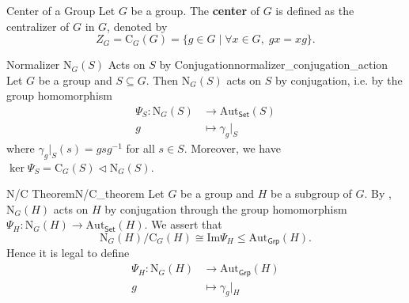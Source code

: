 \begin{definition}{Center of a Group}{}
    Let $G$ be a group. The \textbf{center} of $G$ is defined as the centralizer of $G$ in $G$, denoted by
    \[
        Z_G=\mathrm{C}_G(G)=\{ g\in G\mid \forall x\in G,\; gx=xg\}.
    \]
\end{definition}



\begin{proposition}{Normalizer $\mathrm{N}_G(S)$ Acts on $S$ by Conjugation}{normalizer_conjugation_action}
    Let $G$ be a group and $S\subseteq G$. Then $\mathrm{N}_G(S)$ acts on $S$ by conjugation, i.e. by the group homomorphism
    \begin{align*}
        \Psi_S: \mathrm{N}_G(S) & \longrightarrow \mathrm{Aut}_{\mathsf{Set}}(S) \\
        g                       & \longmapsto \gamma_g|_S
    \end{align*}
    where $\gamma_g|_S(s)=gsg^{-1}$ for all $s\in S$. Moreover, we have $\ker\Psi_S=\mathrm{C}_G(S)\lhd \mathrm{N}_G(S)$.
\end{proposition}


\begin{theorem}{N/C Theorem}{N/C_theorem}
    Let $G$ be a group and $H$ be a subgroup of $G$. By , $\mathrm{N}_G(H)$ acts on $H$ by conjugation through the group homomorphism $\Psi_H:\mathrm{N}_G(H)\to \mathrm{Aut}_{\mathsf{Set}}(H)$. We assert that
    \[
        \mathrm{N}_G(H)/\mathrm{C}_G(H) \cong \mathrm{Im}\Psi_H\le \mathrm{Aut}_{\mathsf{Grp}}(H).
    \]
    Hence it is legal to define
    \begin{align*}
        \Psi_H: \mathrm{N}_G(H) & \longrightarrow \mathrm{Aut}_{\mathsf{Grp}}(H) \\
        g                       & \longmapsto \gamma_g|_H
    \end{align*}
\end{theorem}

